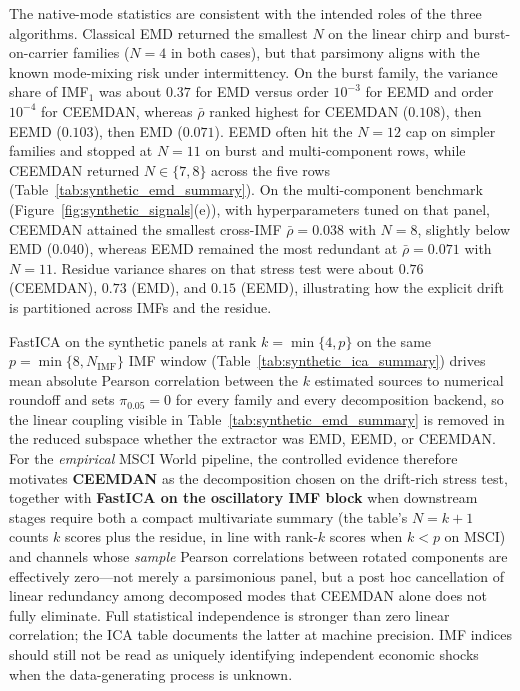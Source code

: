 \documentclass[11pt,a4paper]{article}
\begin{document}
The native-mode statistics are consistent with the intended roles of the three algorithms. Classical EMD returned the smallest $N$ on the linear chirp and burst-on-carrier families ($N=4$ in both cases), but that parsimony aligns with the known mode-mixing risk under intermittency. On the burst family, the variance share of IMF$_1$ was about $0.37$ for EMD versus order $10^{-3}$ for EEMD and order $10^{-4}$ for CEEMDAN, whereas $\bar{\rho}$ ranked highest for CEEMDAN ($0.108$), then EEMD ($0.103$), then EMD ($0.071$). EEMD often hit the $N=12$ cap on simpler families and stopped at $N=11$ on burst and multi-component rows, while CEEMDAN returned $N\in\{7,8\}$ across the five rows (Table~\ref{tab:synthetic_emd_summary}). On the multi-component benchmark (Figure~\ref{fig:synthetic_signals}(e)), with hyperparameters tuned on that panel, CEEMDAN attained the smallest cross-IMF $\bar{\rho}=0.038$ with $N=8$, slightly below EMD ($0.040$), whereas EEMD remained the most redundant at $\bar{\rho}=0.071$ with $N=11$. Residue variance shares on that stress test were about $0.76$ (CEEMDAN), $0.73$ (EMD), and $0.15$ (EEMD), illustrating how the explicit drift is partitioned across IMFs and the residue.

FastICA on the synthetic panels at rank $k=\min\{4,p\}$ on the same $p=\min\{8,N_{\mathrm{IMF}}\}$ IMF window (Table~\ref{tab:synthetic_ica_summary}) drives mean absolute Pearson correlation between the $k$ estimated sources to numerical roundoff and sets $\pi_{0.05}=0$ for every family and every decomposition backend, so the linear coupling visible in Table~\ref{tab:synthetic_emd_summary} is removed in the reduced subspace whether the extractor was EMD, EEMD, or CEEMDAN. For the \emph{empirical} MSCI World pipeline, the controlled evidence therefore motivates \textbf{CEEMDAN} as the decomposition chosen on the drift-rich stress test, together with \textbf{FastICA on the oscillatory IMF block} when downstream stages require both a compact multivariate summary (the table's $N=k+1$ counts $k$ scores plus the residue, in line with rank-$k$ scores when $k<p$ on MSCI) and channels whose \emph{sample} Pearson correlations between rotated components are effectively zero---not merely a parsimonious panel, but a post hoc cancellation of linear redundancy among decomposed modes that CEEMDAN alone does not fully eliminate. Full statistical independence is stronger than zero linear correlation; the ICA table documents the latter at machine precision. IMF indices should still not be read as uniquely identifying independent economic shocks when the data-generating process is unknown.
\end{document}
